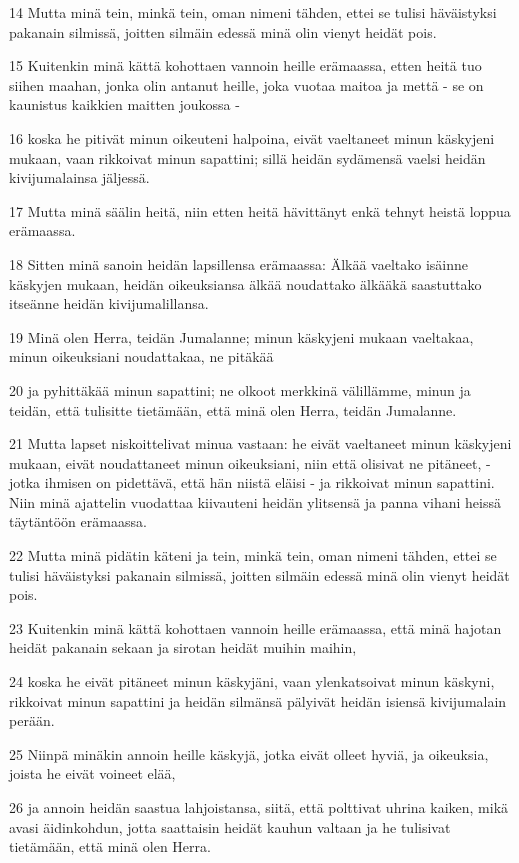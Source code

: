 \par 14 Mutta minä tein, minkä tein, oman nimeni tähden, ettei se tulisi häväistyksi pakanain silmissä, joitten silmäin edessä minä olin vienyt heidät pois.
\par 15 Kuitenkin minä kättä kohottaen vannoin heille erämaassa, etten heitä tuo siihen maahan, jonka olin antanut heille, joka vuotaa maitoa ja mettä - se on kaunistus kaikkien maitten joukossa -
\par 16 koska he pitivät minun oikeuteni halpoina, eivät vaeltaneet minun käskyjeni mukaan, vaan rikkoivat minun sapattini; sillä heidän sydämensä vaelsi heidän kivijumalainsa jäljessä.
\par 17 Mutta minä säälin heitä, niin etten heitä hävittänyt enkä tehnyt heistä loppua erämaassa.
\par 18 Sitten minä sanoin heidän lapsillensa erämaassa: Älkää vaeltako isäinne käskyjen mukaan, heidän oikeuksiansa älkää noudattako älkääkä saastuttako itseänne heidän kivijumalillansa.
\par 19 Minä olen Herra, teidän Jumalanne; minun käskyjeni mukaan vaeltakaa, minun oikeuksiani noudattakaa, ne pitäkää
\par 20 ja pyhittäkää minun sapattini; ne olkoot merkkinä välillämme, minun ja teidän, että tulisitte tietämään, että minä olen Herra, teidän Jumalanne.
\par 21 Mutta lapset niskoittelivat minua vastaan: he eivät vaeltaneet minun käskyjeni mukaan, eivät noudattaneet minun oikeuksiani, niin että olisivat ne pitäneet, - jotka ihmisen on pidettävä, että hän niistä eläisi - ja rikkoivat minun sapattini. Niin minä ajattelin vuodattaa kiivauteni heidän ylitsensä ja panna vihani heissä täytäntöön erämaassa.
\par 22 Mutta minä pidätin käteni ja tein, minkä tein, oman nimeni tähden, ettei se tulisi häväistyksi pakanain silmissä, joitten silmäin edessä minä olin vienyt heidät pois.
\par 23 Kuitenkin minä kättä kohottaen vannoin heille erämaassa, että minä hajotan heidät pakanain sekaan ja sirotan heidät muihin maihin,
\par 24 koska he eivät pitäneet minun käskyjäni, vaan ylenkatsoivat minun käskyni, rikkoivat minun sapattini ja heidän silmänsä pälyivät heidän isiensä kivijumalain perään.
\par 25 Niinpä minäkin annoin heille käskyjä, jotka eivät olleet hyviä, ja oikeuksia, joista he eivät voineet elää,
\par 26 ja annoin heidän saastua lahjoistansa, siitä, että polttivat uhrina kaiken, mikä avasi äidinkohdun, jotta saattaisin heidät kauhun valtaan ja he tulisivat tietämään, että minä olen Herra.
